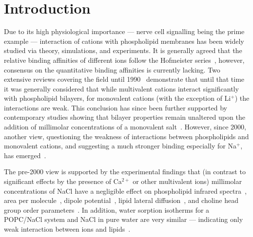 \documentclass[twoside,twocolumn,9pt]{article}
\begin{document}




\section{Introduction}

Due to its high physiological importance --- nerve cell signalling being the prime example ---
interaction of cations with phospholipid membranes
has been widely studied via theory, simulations, and experiments.
It is generally agreed that the relative binding affinities of different ions 
follow the Hofmeister series~\cite{eisenberg79,cevc90,tocanne90,binder02,celma07,leontidis09,vacha09a,klasczyk10,harb13}, 
however,
consensus on the quantitative binding affinities is currently lacking.
Two extensive reviews covering the field until 1990~\cite{cevc90,tocanne90}
demonstrate that until that time it was generally considered that
while  multivalent cations interact significantly with phospholipid bilayers,
for monovalent cations (with the exception of Li$^+$) the interactions are weak.
This conclusion has since been further supported by contemporary
studies showing that bilayer properties remain unaltered upon the addition of millimolar concentrations of a monovalent 
salt~\cite{binder02,pabst07,filippov09}. 
However, since 2000, another view, questioning the weakness of interactions between phospholipids and monovalent cations,
and suggesting a much stronger binding especially for Na$^{+}$, has emerged~\cite{bockmann03,bockmann04,vacha09a,manyes05,manyes06,fukuma07,leontidis09,ferber11,morata12,klasczyk10,harb13}.

The pre-2000 view is supported by the experimental findings that
(in contrast to significant effects by the presence of Ca$^{2+}$ or other multivalent ions)
millimolar concentrations of NaCl have a negligible effect on
phospholipid infrared spectra~\cite{binder02},
area per molecule~\cite{pabst07},
dipole potential~\cite{clarke99},
lipid lateral diffusion~\cite{filippov09},
and choline head group order parameters~\cite{akutsu81}.
In addition, water sorption isotherms for a POPC/NaCl system and NaCl in pure water are very similar
--- indicating only weak interaction between ions and lipids~\cite{binder02}. 
\end{document}
